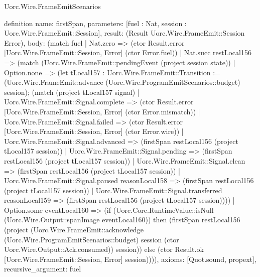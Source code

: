 \begin{lexlean}{Uorc.Wire.FrameEmitScenarios}
\begin{semanticmodule}
definition{
  name: firstSpan,
  parameters: [fuel : Nat, session : Uorc.Wire.FrameEmit::Session],
  result: (Result Uorc.Wire.FrameEmit::Session Error),
  body: (match fuel
    | Nat.zero => (ctor Result.error [Uorc.Wire.FrameEmit::Session, Error] (ctor Error.fuel))
    | Nat.succ restLocal156 => (match (Uorc.Wire.FrameEmit::pendingEvent (project session state))
      | Option.none => (let tLocal157 : Uorc.Wire.FrameEmit::Transition := (Uorc.Wire.FrameEmit::advance (Uorc.Wire.ProgramEmitScenarios::budget) session); (match (project tLocal157 signal)
        | Uorc.Wire.FrameEmit::Signal.complete => (ctor Result.error [Uorc.Wire.FrameEmit::Session, Error] (ctor Error.mismatch))
        | Uorc.Wire.FrameEmit::Signal.failed => (ctor Result.error [Uorc.Wire.FrameEmit::Session, Error] (ctor Error.wire))
        | Uorc.Wire.FrameEmit::Signal.advanced => (firstSpan restLocal156 (project tLocal157 session))
        | Uorc.Wire.FrameEmit::Signal.pending => (firstSpan restLocal156 (project tLocal157 session))
        | Uorc.Wire.FrameEmit::Signal.clean => (firstSpan restLocal156 (project tLocal157 session))
        | Uorc.Wire.FrameEmit::Signal.paused reasonLocal158 => (firstSpan restLocal156 (project tLocal157 session))
        | Uorc.Wire.FrameEmit::Signal.transferred reasonLocal159 => (firstSpan restLocal156 (project tLocal157 session))))
      | Option.some eventLocal160 => (if (Uorc.Core.RuntimeValue::isNull (Uorc.Wire.Output::spanImage eventLocal160)) then (firstSpan restLocal156 (project (Uorc.Wire.FrameEmit::acknowledge (Uorc.Wire.ProgramEmitScenarios::budget) session (ctor Uorc.Wire.Output::Ack.consumed)) session)) else (ctor Result.ok [Uorc.Wire.FrameEmit::Session, Error] session)))),
  axioms: [Quot.sound, propext],
  recursive_argument: fuel
}


\end{semanticmodule}
\end{lexlean}
